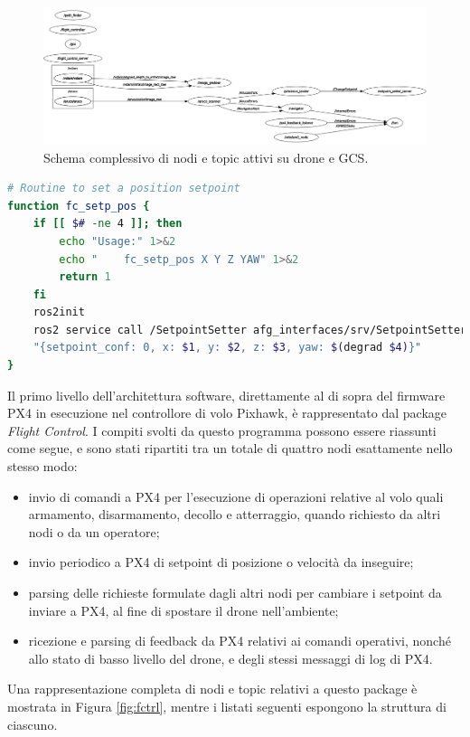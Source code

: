 \begin{figure}
    \centering
    \includegraphics[width=\textwidth]{figs/chapter3/nodesgraph.png}
    \caption{Schema complessivo di nodi e topic attivi su drone e GCS.}
    \label{fig:nodesgraph}
\end{figure}
\vfill\newpage

\begin{lstlisting}[language=bash, caption={Esempio di funzione Bash per cambiare setpoint di posizione corrente.}, label={lst:fcsetp}]
# Routine to set a position setpoint
function fc_setp_pos {
    if [[ $# -ne 4 ]]; then
        echo "Usage:" 1>&2
        echo "    fc_setp_pos X Y Z YAW" 1>&2
        return 1
    fi
    ros2init
    ros2 service call /SetpointSetter afg_interfaces/srv/SetpointSetter\
    "{setpoint_conf: 0, x: $1, y: $2, z: $3, yaw: $(degrad $4)}"
}
\end{lstlisting}

\indent Il primo livello dell'architettura software, direttamente al di sopra del firmware PX4 in esecuzione nel controllore di volo Pixhawk, è rappresentato dal package \emph{Flight Control}. I compiti svolti da questo programma possono essere riassunti come segue, e sono stati ripartiti tra un totale di quattro nodi esattamente nello stesso modo:
\begin{itemize}
    \item invio di comandi a PX4 per l'esecuzione di operazioni relative al volo quali armamento, disarmamento, decollo e atterraggio, quando richiesto da altri nodi o da un operatore;
    \item invio periodico a PX4 di setpoint di posizione o velocità da inseguire;
    \item parsing delle richieste formulate dagli altri nodi per cambiare i setpoint da inviare a PX4, al fine di spostare il drone nell'ambiente;
    \item ricezione e parsing di feedback da PX4 relativi ai comandi operativi, nonché allo stato di basso livello del drone, e degli stessi messaggi di log di PX4.
\end{itemize}
Una rappresentazione completa di nodi e topic relativi a questo package è mostrata in Figura \ref{fig:fctrl}, mentre i listati seguenti espongono la struttura di ciascuno.
\newpage

